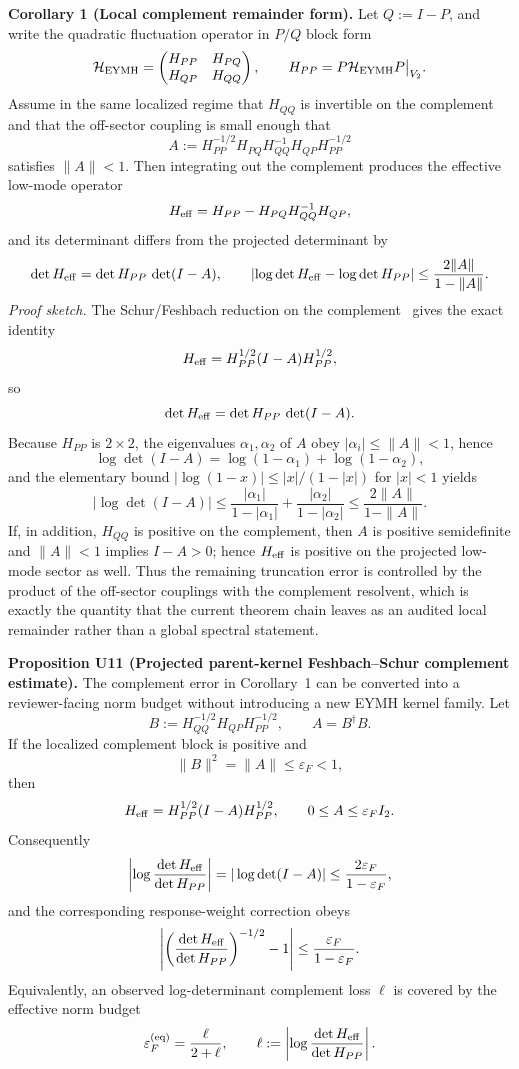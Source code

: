 \documentclass[aps,prd,onecolumn,notitlepage,nofootinbib,superscriptaddress,11pt,floatfix]{revtex4-2}
\begin{document}
\noindent\textbf{Corollary 1 (Local complement remainder form).}
Let \(Q:=I-P\), and write the quadratic fluctuation operator in \(P/Q\) block form
\[
\mathcal H_{\rm EYMH}
=
\begin{pmatrix}
H_{PP} & H_{PQ}\\
H_{QP} & H_{QQ}
\end{pmatrix},
\qquad
H_{PP}=P\mathcal H_{\rm EYMH}P\big|_{V_2}.
\]
Assume in the same localized regime that \(H_{QQ}\) is invertible on the complement and that the off-sector coupling is small enough that
\[
A:=
H_{PP}^{-1/2}H_{PQ}H_{QQ}^{-1}H_{QP}H_{PP}^{-1/2}
\]
satisfies \(\|A\|<1\). Then integrating out the complement produces the effective low-mode operator
\[
H_{\rm eff}
=
H_{PP}-H_{PQ}H_{QQ}^{-1}H_{QP},
\]
and its determinant differs from the projected determinant by
\[
\det H_{\rm eff}
=
\det H_{PP}\,\det(I-A),
\qquad
\left|\log\det H_{\rm eff}-\log\det H_{PP}\right|
\le
\frac{2\|A\|}{1-\|A\|}.
\]
\emph{Proof sketch.}
The Schur/Feshbach reduction on the complement~\cite{Feshbach1958,HornJohnson2012} gives the exact identity
\[
H_{\rm eff}
=
H_{PP}^{1/2}(I-A)H_{PP}^{1/2},
\]
so
\[
\det H_{\rm eff}
=
\det H_{PP}\,\det(I-A).
\]
Because \(H_{PP}\) is \(2\times2\), the eigenvalues \(\alpha_1,\alpha_2\) of \(A\) obey \(|\alpha_i|\le \|A\|<1\), hence
\[
\log\det(I-A)=\log(1-\alpha_1)+\log(1-\alpha_2),
\]
and the elementary bound \(|\log(1-x)|\le |x|/(1-|x|)\) for \(|x|<1\) yields
\[
\left|\log\det(I-A)\right|
\le
\frac{|\alpha_1|}{1-|\alpha_1|}+\frac{|\alpha_2|}{1-|\alpha_2|}
\le
\frac{2\|A\|}{1-\|A\|}.
\]
If, in addition, \(H_{QQ}\) is positive on the complement, then \(A\) is positive semidefinite and \(\|A\|<1\) implies \(I-A>0\); hence \(H_{\rm eff}\) is positive on the projected low-mode sector as well. Thus the remaining truncation error is controlled by the product of the off-sector couplings with the complement resolvent, which is exactly the quantity that the current theorem chain leaves as an audited local remainder rather than a global spectral statement.

\medskip\noindent\textbf{Proposition U11 (Projected parent-kernel Feshbach--Schur complement estimate).}
The complement error in Corollary~1 can be converted into a reviewer-facing norm budget without introducing a new EYMH kernel family.  Let
\[
B:=H_{QQ}^{-1/2}H_{QP}H_{PP}^{-1/2},
\qquad
A=B^\dagger B.
\]
If the localized complement block is positive and
\[
\|B\|^2=\|A\|\le \varepsilon_F<1,
\]
then
\[
H_{\rm eff}
=
H_{PP}^{1/2}(I-A)H_{PP}^{1/2},
\qquad
0\le A\le \varepsilon_F I_2.
\]
Consequently
\[
\left|
\log\frac{\det H_{\rm eff}}{\det H_{PP}}
\right|
=
|\log\det(I-A)|
\le
\frac{2\varepsilon_F}{1-\varepsilon_F},
\]
and the corresponding response-weight correction obeys
\[
\left|
\left(\frac{\det H_{\rm eff}}{\det H_{PP}}\right)^{-1/2}-1
\right|
\le
\frac{\varepsilon_F}{1-\varepsilon_F}.
\]
Equivalently, an observed log-determinant complement loss \(\ell\) is covered by the effective norm budget
\[
\varepsilon_F^{\rm(eq)}
=
\frac{\ell}{2+\ell},
\qquad
\ell:=
\left|
\log\frac{\det H_{\rm eff}}{\det H_{PP}}
\right|.
\]
\end{document}
